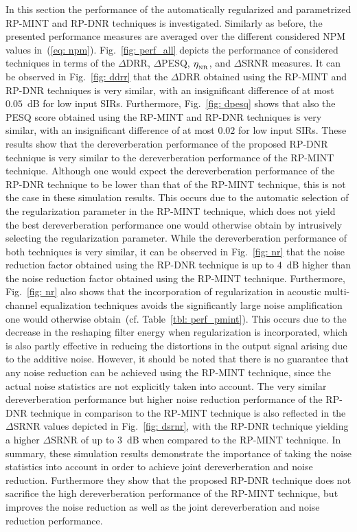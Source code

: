 \documentclass{aes60i}
\begin{document}
In this section the performance of the automatically regularized and parametrized RP-MINT and RP-DNR techniques is investigated.
Similarly as before, the presented performance measures are averaged over the different considered NPM values in~(\ref{eq: npm}).
Fig.~\ref{fig: perf_all} depicts the performance of considered techniques in terms of the $\Delta$DRR, $\Delta$PESQ, $\eta_{_{\rm NR}}$, and $\Delta$SRNR measures.
It can be observed in Fig.~\ref{fig: ddrr} that the $\Delta$DRR obtained using the RP-MINT and RP-DNR techniques is very similar, with an insignificant difference of at most $0.05$~dB for low input SIRs.
Furthermore, Fig.~\ref{fig: dpesq} shows that also the PESQ score obtained using the RP-MINT and RP-DNR techniques is very similar, with an insignificant difference of at most $0.02$ for low input SIRs.
These results show that the dereverberation performance of the proposed RP-DNR technique is very similar to the dereverberation performance of the RP-MINT technique.
Although one would expect the dereverberation performance of the RP-DNR technique to be lower than that of the RP-MINT technique, this is not the case in these simulation results.
This occurs due to the automatic selection of the regularization parameter in the RP-MINT technique, which does not yield the best dereverberation performance one would otherwise obtain by intrusively selecting the regularization parameter.
While the dereverberation performance of both techniques is very similar, it can be observed in Fig.~\ref{fig: nr} that the noise reduction factor obtained using the RP-DNR technique is up to $4$~dB higher than the noise reduction factor obtained using the RP-MINT technique.
Furthermore, Fig.~\ref{fig: nr} also shows that the incorporation of regularization in acoustic multi-channel equalization techniques avoids the significantly large noise amplification one would otherwise obtain~(cf. Table~\ref{tbl: perf_pmint}).
This occurs due to the decrease in the reshaping filter energy when regularization is incorporated, which is also partly effective in reducing the distortions in the output signal arising due to the additive noise.
However, it should be noted that there is no guarantee that any noise reduction can be achieved using the RP-MINT technique, since the actual noise statistics are not explicitly taken into account.
The very similar dereverberation performance but higher noise reduction performance of the RP-DNR technique in comparison to the RP-MINT technique is also reflected in the $\Delta$SRNR values depicted in Fig.~\ref{fig: dsrnr}, with the RP-DNR technique yielding a higher $\Delta$SRNR of up to $3$~dB when compared to the RP-MINT technique.
\newline
In summary, these simulation results demonstrate the importance of taking the noise statistics into account in order to achieve joint dereverberation and noise reduction.
Furthermore they show that the proposed RP-DNR technique does not sacrifice the high dereverberation performance of the RP-MINT technique, but improves the noise reduction as well as the joint dereverberation and noise reduction performance.
\end{document}
